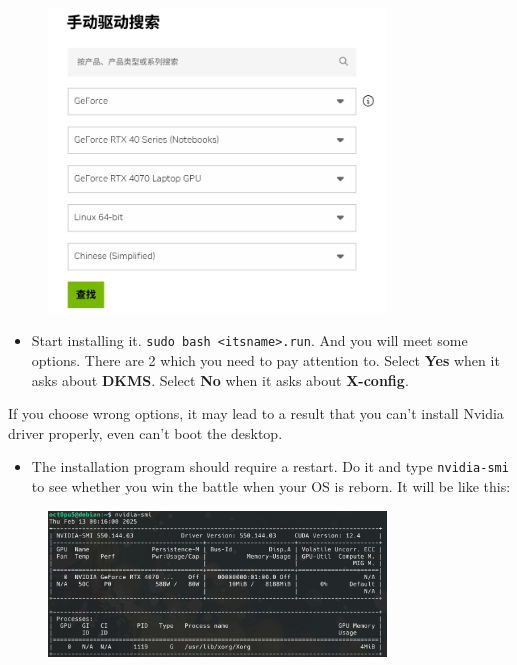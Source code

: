 \documentclass[12pt]{ctexart}
\newenvironment{mdquote}
{%
  \par\noindent
  \begin{list}{}{%
      \setlength{\leftmargin}{1em}%
      \setlength{\rightmargin}{0pt}%
      \setlength{\itemindent}{0pt}%
      \setlength{\listparindent}{\parindent}%
      \setlength{\topsep}{0.5\baselineskip}%
  }
  \item[\textbf{>}\ ]\itshape
}
{\end{list}\par}
\begin{document}
\begin{figure}[H]
    \centering
    \includegraphics[width=0.8\textwidth,keepaspectratio]{assets/Linux/3.2 Decorate your own garden/3.png}
\end{figure}

\begin{itemize}
\item
  Start installing it.
  \texttt{sudo\ bash\ \textless{}itsname\textgreater{}.run}. And you
  will meet some options. There are 2 which you need to pay attention
  to. Select \textbf{Yes} when it asks about \textbf{DKMS}. Select
  \textbf{No} when it asks about \textbf{X-config}.
\end{itemize}

\begin{mdquote}
If you choose wrong options, it may lead to a result that you
can't install Nvidia driver properly, even
can't boot the desktop.
\end{mdquote}

\begin{itemize}
\item
  The installation program should require a restart. Do it and type
  \texttt{nvidia-smi} to see whether you win the battle when your OS is
  reborn. It will be like this:
\end{itemize}

\begin{figure}[H]
    \centering
    \includegraphics[width=0.8\textwidth,keepaspectratio]{assets/Linux/3.2 Decorate your own garden/4.png}
\end{figure}
\end{document}
